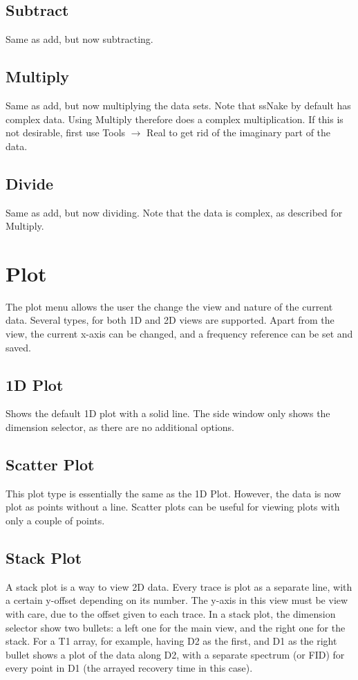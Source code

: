 \documentclass[11pt,a4paper]{article}
\begin{document}
\subsection{Subtract}
Same as add, but now subtracting.

\subsection{Multiply}
Same as add, but now multiplying the data sets. Note that ssNake by default has complex data. Using Multiply therefore does a complex multiplication.
If this is not desirable, first use Tools $\rightarrow$ Real to get rid of the imaginary part of the data.

\subsection{Divide}
Same as add, but now dividing. Note that the data is complex, as described for Multiply.




\section{Plot}
The plot menu allows the user the change the view and nature of the current data. Several types, for both 1D and 2D views are supported. Apart from the view, the current x-axis can be changed, and a
frequency reference can be set and saved.


\subsection{1D Plot}
Shows the default 1D plot with a solid line. The side window only shows the dimension selector, as there are no additional options.


\subsection{Scatter Plot}
This plot type is essentially the same as the 1D Plot. However, the data is now plot as points without a line. Scatter plots can be useful for viewing
plots with only a couple of points.

\subsection{Stack Plot}
A stack plot is a way to view 2D data. Every trace is plot as a separate line, with a certain y-offset depending on its number. The y-axis in this view must be view with care,
due to the offset given to each trace. In a stack plot, the dimension selector show two bullets: a left one for the main view, and the right one for the stack. For a T1 array, for example, having D2 as the first, and D1
as the right bullet shows a plot of the data along D2, with a separate spectrum (or FID) for every point in D1 (the arrayed recovery time in this case).
\end{document}
